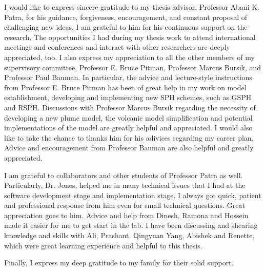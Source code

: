 I would like to express sincere gratitude to my thesis advisor, Professor Abani K. Patra, for his
guidance, forgiveness, encouragement, and constant proposal of challenging new ideas. I am grateful
to him for his continuous support on the research. The opportunities I had during my thesis work to attend international meetings and conferences and interact with other researchers are deeply appreciated, too.
I also express my appreciation to all the other members of my supervisory committee, Professor E. Bruce Pitman, Professor Marcus Bursik, and Professor Paul Bauman. In particular, the advice
and lecture-style instructions from Professor E. Bruce Pitman has been of great help in my work on model establishment, developing and implementing new SPH schemes, such as GSPH and RSPH. Discussions with Professor Marcus Bursik regarding the necessity of developing a new plume model, the volcanic model simplification and potential implementations of the model are greatly helpful and appreciated. I would also like to take the chance to thanks him for his adivices regarding my career plan. Advice and encouragement from Professor Bauman are also helpful and greatly appreciated.

I am grateful to collaborators and other students of Professor Patra as well. Particularly, Dr. Jones, helped me in many technical issues that I had at the software development stage and implementation stage. I always got quick, patient and professional response from him even for small technical questions. Great appreciation goes to him. Advice and help from Dinesh, Ramona and Hossein made it easier for me to get start in the lab. I have been discussing and shearing knowledge and skills with Ali, Prashant, Qingyuan Yang, Abishek and Renette, which were great learning experience and helpful to this thesis. 
 
Finally, I express my deep gratitude to my family for their solid support.